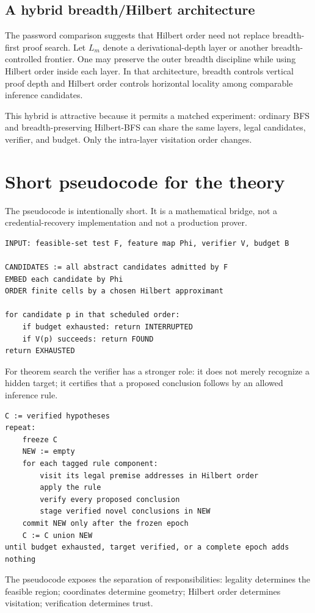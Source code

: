 \documentclass[11pt]{article}
\theoremstyle{hilberttheorem}
\begin{document}
\subsection{A hybrid breadth/Hilbert architecture}\label{subsec:hybrid}
The password comparison suggests that Hilbert order need not replace breadth-first proof search. Let $L_m$ denote a derivational-depth layer or another breadth-controlled frontier. One may preserve the outer breadth discipline while using Hilbert order inside each layer. In that architecture, breadth controls vertical proof depth and Hilbert order controls horizontal locality among comparable inference candidates.

This hybrid is attractive because it permits a matched experiment: ordinary BFS and breadth-preserving Hilbert-BFS can share the same layers, legal candidates, verifier, and budget. Only the intra-layer visitation order changes.

\section{Short pseudocode for the theory}\label{sec:pseudocode}
The pseudocode is intentionally short. It is a mathematical bridge, not a credential-recovery implementation and not a production prover.
\begin{lstlisting}[style=hilbertcode,caption={Abstract constrained-search scheduler}]
INPUT: feasible-set test F, feature map Phi, verifier V, budget B

CANDIDATES := all abstract candidates admitted by F
EMBED each candidate by Phi
ORDER finite cells by a chosen Hilbert approximant

for candidate p in that scheduled order:
    if budget exhausted: return INTERRUPTED
    if V(p) succeeds: return FOUND
return EXHAUSTED
\end{lstlisting}

For theorem search the verifier has a stronger role: it does not merely recognize a hidden target; it certifies that a proposed conclusion follows by an allowed inference rule.
\begin{lstlisting}[style=hilbertcode,caption={Frozen-epoch Hilbert theorem search}]
C := verified hypotheses
repeat:
    freeze C
    NEW := empty
    for each tagged rule component:
        visit its legal premise addresses in Hilbert order
        apply the rule
        verify every proposed conclusion
        stage verified novel conclusions in NEW
    commit NEW only after the frozen epoch
    C := C union NEW
until budget exhausted, target verified, or a complete epoch adds nothing
\end{lstlisting}
The pseudocode exposes the separation of responsibilities: legality determines the feasible region; coordinates determine geometry; Hilbert order determines visitation; verification determines trust.
\end{document}
